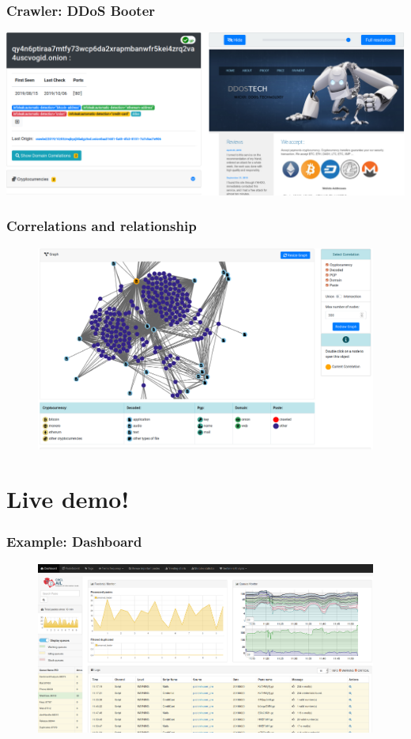 \documentclass{beamer}
\begin{document}
\begin{frame}
    \frametitle{Crawler: DDoS Booter}
    \centerline{
        \includegraphics[scale=0.23]{images/crawled-ddos.png}
    }
\end{frame}

\begin{frame}
    \frametitle{Correlations and relationship}
    \begin{figure}
        \includegraphics[scale=0.18, angle=0]{images/ail-correlation.png}
    \end{figure}
\end{frame}

\section{Live demo!}

\begin{frame}
    \frametitle{Example: Dashboard}
    \begin{figure}
        \includegraphics[scale=0.18, angle=0]{screenshot/dashboard.png}
    \end{figure}
\end{frame}
\end{document}
